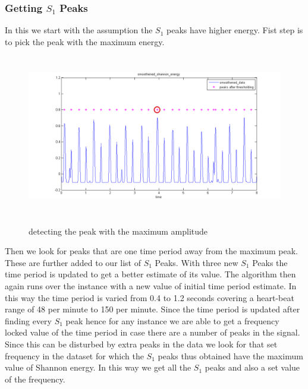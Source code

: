 \documentclass{article}
\begin{document}
\subsubsection{Getting $S_1$ Peaks}
In this we start with the assumption the $S_1$ peaks have higher energy. Fist step is to pick the peak with the maximum energy. 

\begin{figure}
\begin{center}
\includegraphics[width=400pt, height=200pt]{detect_max_peak.png}\\
\caption{detecting the peak with the maximum amplitude}
\end{center}
\end{figure}

Then we look for peaks that are one time period away from the maximum peak. These are further added to our list of $S_1$ Peaks. With three new $S_1$ Peaks the time period is updated to get a better estimate of its value. The algorithm then again runs over the instance with a new value of initial time period estimate. In this way the time period is varied from 0.4 to 1.2 seconds covering a heart-beat range of 48 per minute to 150 per minute. Since the time period is updated after finding every $S_1$ peak hence for any instance we are able to get a frequency locked value of the time period in case there are a number of peaks in the signal. Since this can be disturbed by extra peaks in the data we look for that set frequency in the dataset for which the $S_1$ peaks thus obtained have the maximum value of Shannon energy. In this way we get all the $S_1$ peaks and also a set value of the frequency.\\
\end{document}
